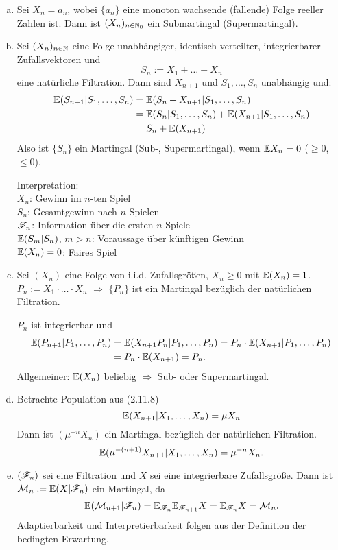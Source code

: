 \begin{exmp}
  \begin{enumerate}[a)]
  \item Sei $X_n = a_n$, wobei $\{ a_n \}$ eine monoton wachsende (fallende)
    Folge reeller Zahlen ist. Dann ist $(X_n)_{n \in \mathbb{N}_0}$ ein Submartingal
    (Supermartingal).
  \item Sei $(X_n)_{n \in \mathbb{N}}$ eine Folge unabhängiger, identisch verteilter,
    integrierbarer Zufallsvektoren und
    \[ S_n := X_1 + \ldots + X_n \]
    eine natürliche Filtration. Dann sind $X_{n+1}$ und $S_1, \ldots, S_n$
    unabhängig und:
    \begin{align*}
      \mathbb{E}( S_{n+1} | S_1, \ldots, S_n)
      &= \mathbb{E}( S_n + X_{n+1} | S_1, \ldots, S_n ) \\
      &= \mathbb{E}( S_n | S_1, \ldots, S_n ) + \mathbb{E}( X_{n+1} | S_1, \ldots, S_n ) \\
      &= S_n + \mathbb{E}( X_{n+1} )
    \end{align*}
    Also ist $\{S_n\}$ ein Martingal (Sub-, Supermartingal), wenn $\mathbb{E}
    X_n = 0$ ($\ge 0$, $\le 0$).

    Interpretation: \\
    $X_n$: Gewinn im $n$-ten Spiel \\
    $S_n$: Gesamtgewinn nach $n$ Spielen \\
    $\mathscr{F}_n$: Information über die ersten $n$ Spiele \\
    $\mathbb{E}(S_m | S_n)$, $m > n$: Voraussage über künftigen Gewinn \\
    $\mathbb{E}(X_n) = 0$: Faires Spiel

  \item Sei $(X_n)$ eine Folge von i.i.d. Zufallsgrößen, $X_n \ge 0$ mit
    $\mathbb{E}(X_n) = 1$. $P_n := X_1 \cdot \ldots \cdot X_n$ $\Rightarrow$ $\{P_n\}$
    ist ein Martingal bezüglich der natürlichen Filtration.

    $P_n$ ist integrierbar und
    \begin{align*}
      \mathbb{E}( P_{n+1} | P_1, \ldots, P_n)
      &= \mathbb{E}( X_{n+1} P_n | P_1, \ldots, P_n) = P_n \cdot \mathbb{E}(X_{n+1} | P_1, \ldots, P_n) \\
      &= P_n \cdot \mathbb{E}(X_{n+1}) = P_n.
    \end{align*}
    Allgemeiner: $\mathbb{E}(X_n)$ beliebig $\Rightarrow$ Sub- oder Supermartingal.
  \item Betrachte Population aus (2.11.8)
    \[ \mathbb{E}(X_{n+1} | X_1, \ldots, X_n ) = \mu X_n \]
    Dann ist $(\mu^{-n} X_n)$ ein Martingal bezüglich der natürlichen
    Filtration.
    \[ \mathbb{E}( \mu^{-(n+1)} X_{n+1} | X_1, \ldots, X_n ) = \mu^{-n} X_n. \]
  \item $(\mathscr{F}_n)$ sei eine Filtration und $X$ sei eine integrierbare
    Zufallsgröße. Dann ist $\mathcal{M}_n := \mathbb{E}( X | \mathscr{F}_n )$ ein Martingal, da
    \begin{align*}
      \mathbb{E}(\mathcal{M}_{n+1} | \mathscr{F}_n) = \mathbb{E}_{\mathscr{F}_n} \mathbb{E}_{\mathscr{F}_{n+1}} X = \mathbb{E}_{\mathscr{F}_n} X = \mathcal{M}_n.
    \end{align*}
    Adaptierbarkeit und Interpretierbarkeit folgen aus der Definition der
    bedingten Erwartung.
  \end{enumerate}
\end{exmp}


